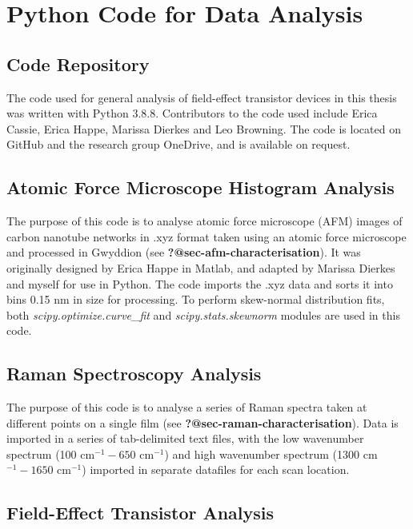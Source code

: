 \documentclass[
  a4paper,
]{scrbook}
\begin{document}
\hypertarget{sec-python}{%
\chapter{Python Code for Data Analysis}\label{sec-python}}

\hypertarget{code-repository}{%
\section{Code Repository}\label{code-repository}}

The code used for general analysis of field-effect transistor devices in
this thesis was written with Python 3.8.8. Contributors to the code used
include Erica Cassie, Erica Happe, Marissa Dierkes and Leo Browning. The
code is located on GitHub and the research group OneDrive, and is
available on request.

\hypertarget{sec-histogram-analysis}{%
\section{Atomic Force Microscope Histogram
Analysis}\label{sec-histogram-analysis}}

The purpose of this code is to analyse atomic force microscope (AFM)
images of carbon nanotube networks in .xyz format taken using an atomic
force microscope and processed in Gwyddion (see
\textbf{?@sec-afm-characterisation}). It was originally designed by
Erica Happe in Matlab, and adapted by Marissa Dierkes and myself for use
in Python. The code imports the .xyz data and sorts it into bins 0.15 nm
in size for processing. To perform skew-normal distribution fits, both
\emph{scipy.optimize.curve\_fit} and \emph{scipy.stats.skewnorm} modules
are used in this code.

\hypertarget{sec-raman-analysis}{%
\section{Raman Spectroscopy Analysis}\label{sec-raman-analysis}}

The purpose of this code is to analyse a series of Raman spectra taken
at different points on a single film (see
\textbf{?@sec-raman-characterisation}). Data is imported in a series of
tab-delimited text files, with the low wavenumber spectrum (100
cm\(^{-1} - 650\) cm\(^{-1}\)) and high wavenumber spectrum (1300
cm\(^{-1} - 1650\) cm\(^{-1}\)) imported in separate datafiles for each
scan location.

\hypertarget{sec-field-effect-transistor-analysis}{%
\section{Field-Effect Transistor
Analysis}\label{sec-field-effect-transistor-analysis}}
\end{document}
